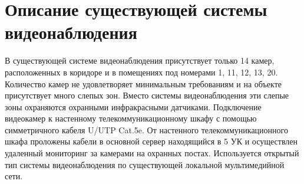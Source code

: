 \section{Описание существующей системы видеонаблюдения}

В существующей системе видеонаблюдения присутствует только 14 камер, расположенных в коридоре 
и в помещениях под номерами 1, 11, 12, 13, 20. Количество камер не удовлетворяет минимальным 
требованиям и на объекте присутствует много слепых зон. Вместо системы видеонаблюдения эти 
слепые зоны охраняются охранными инфракрасными датчиками. Подключение видеокамер к настенному 
телекоммуникационному шкафу с помощью симметричного кабеля U/UTP Cat.5e. От настенного 
телекоммуникационного шкафа проложены кабели в основной сервер находящийся в 5 УК и осуществлен 
удаленный мониторинг за камерами на охранных постах. Используется открытый тип системы 
видеонаблюдения по существующей локальной мультимедийной сети.
